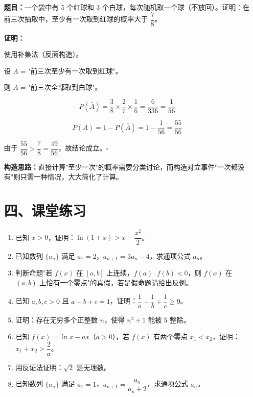 \documentclass[12pt, a4paper]{ctexart}
\begin{document}
\begin{appbox}[【应用3】构造法在概率中的应用]
\textbf{题目：}一个袋中有 $5$ 个红球和 $3$ 个白球，每次随机取一个球（不放回）。证明：在前三次抽取中，至少有一次取到红球的概率大于 $\dfrac{7}{8}$。

\medskip
\textbf{证明：}

使用补集法（反面构造）。

设 $A$ = "前三次至少有一次取到红球"。

则 $\bar{A}$ = "前三次全部取到白球"。

$$P(\bar{A}) = \frac{3}{8} \times \frac{2}{7} \times \frac{1}{6} = \frac{6}{336} = \frac{1}{56}$$

$$P(A) = 1 - P(\bar{A}) = 1 - \frac{1}{56} = \frac{55}{56}$$

由于 $\dfrac{55}{56} > \dfrac{7}{8} = \dfrac{49}{56}$，故结论成立。\hfill$\square$

\medskip
\textbf{构造思路：}直接计算"至少一次"的概率需要分类讨论，而构造对立事件"一次都没有"则只需一种情况，大大简化了计算。
\end{appbox}

\section*{\textcolor{tipgreen}{四、课堂练习}}

\begin{enumerate}
  \item 已知 $x > 0$，证明：$\ln(1+x) > x - \dfrac{x^2}{2}$。

  \item 已知数列 $\{a_n\}$ 满足 $a_1 = 2$，$a_{n+1} = 3a_n - 4$，求通项公式 $a_n$。

  \item 判断命题"若 $f(x)$ 在 $[a,b]$ 上连续，$f(a) \cdot f(b) < 0$，则 $f(x)$ 在 $(a,b)$ 上恰有一个零点"的真假，若是假命题请给出反例。

  \item 已知 $a, b, c > 0$ 且 $a + b + c = 1$，证明：$\dfrac{1}{a} + \dfrac{1}{b} + \dfrac{1}{c} \geq 9$。

  \item 证明：存在无穷多个正整数 $n$，使得 $n^2 + 1$ 能被 $5$ 整除。

  \item 已知 $f(x) = \ln x - ax$（$a > 0$），若 $f(x)$ 有两个零点 $x_1 < x_2$，证明：$x_1 + x_2 > \dfrac{2}{a}$。

  \item 用反证法证明：$\sqrt{2}$ 是无理数。

  \item 已知数列 $\{a_n\}$ 满足 $a_1 = 1$，$a_{n+1} = \dfrac{a_n}{a_n + 2}$，求通项公式 $a_n$。
\end{enumerate}
\end{document}

